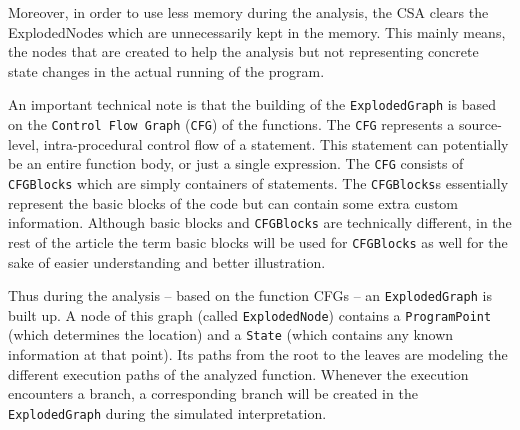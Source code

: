 Moreover, in order to use less memory during the analysis, the CSA clears the ExplodedNodes which are unnecessarily kept in the memory. This mainly means, the nodes that are created to help the analysis but not representing concrete state changes in the actual running of the program.

An important technical note is that the building 
of the \texttt{ExplodedGraph} is based on the \texttt{Control Flow Graph} 
(\texttt{CFG}) of the functions. The \texttt{CFG} represents a source-level, 
intra-procedural control flow of a 
statement. This statement can potentially be an entire function body, or just a 
single expression. The \texttt{CFG} consists of \texttt{CFGBlocks} which are 
simply containers of statements. The \texttt{CFGBlocks}s essentially represent 
the basic blocks of the code but can contain some extra custom information. 
Although basic blocks and \texttt{CFGBlocks} are technically different, in the 
rest of the article the term basic blocks will be used for \texttt{CFGBlocks} 
as well for the sake of easier understanding and better illustration.

Thus during the analysis -- based on the function CFGs -- an 
\texttt{ExplodedGraph} is built up. A 
node of this graph (called \texttt{ExplodedNode}) contains a 
\texttt{ProgramPoint} (which determines the location) and a \texttt{State} 
(which contains any known information at that point). Its paths from the root 
to the leaves are modeling the different execution paths of the analyzed 
function. Whenever the execution encounters a branch, a corresponding branch 
will be created in the \texttt{ExplodedGraph} during the simulated 
interpretation.

